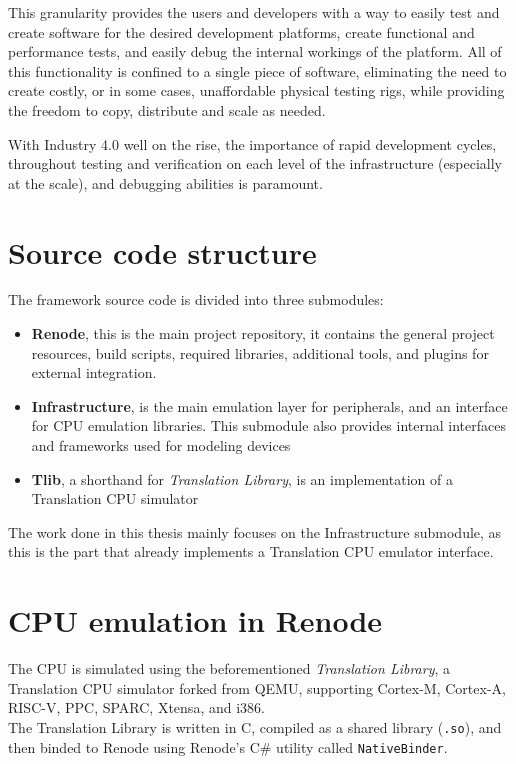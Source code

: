 \noindent
This granularity provides the users and developers with a way to easily test and create software for the desired
development platforms, create functional and performance tests, and easily debug the internal workings of the platform.
All of this functionality is confined to a single piece of software, eliminating the need to create costly, or in some
cases, unaffordable physical testing rigs, while providing the freedom to copy, distribute and scale as needed.

With Industry 4.0 well on the rise, the importance of rapid development cycles, throughout testing and verification
on each level of the infrastructure (especially at the scale), and debugging abilities is paramount.

\section*{Source code structure}
The framework source code \cite{Renode} is divided into three submodules:

\begin{itemize}
    \item{\textbf{Renode}, this is the main project repository, it contains the general project resources, build
    scripts, required libraries, additional tools, and plugins for external integration.}
    \item{\textbf{Infrastructure}, is the main emulation layer for peripherals, and an interface for CPU emulation
    libraries. This submodule also provides internal interfaces and frameworks used for modeling devices}
    \item{\textbf{Tlib}, a shorthand for \textit{Translation Library}, is an implementation of a Translation CPU
    simulator}
\end{itemize}

\noindent
The work done in this thesis mainly focuses on the Infrastructure submodule, as this is the part that already implements
a Translation CPU emulator interface.

\section*{CPU emulation in Renode}

The CPU is simulated using the beforementioned \textit{Translation Library}, a Translation CPU simulator
forked from QEMU, supporting Cortex-M, Cortex-A, RISC-V, PPC, SPARC, Xtensa, and i386.\\
The Translation Library is written in C, compiled as a shared library (\texttt{.so}), and then binded to Renode using
Renode's C\# utility called \texttt{NativeBinder}.

